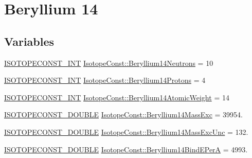 \hypertarget{group___isotope_const-_beryllium-_be14}{}\section{Beryllium 14}
\label{group___isotope_const-_beryllium-_be14}
\subsection*{Variables}
\begin{DoxyCompactItemize}
\item 
\mbox{\hyperlink{group___isotope_const-_macros_ga5f18360b3e99483a35c32d789e62621c}{I\+S\+O\+T\+O\+P\+E\+C\+O\+N\+S\+T\+\_\+\+I\+NT}} \mbox{\hyperlink{group___isotope_const-_beryllium-_be14_ga480138d58c6c1645063d7c3944cf50ba}{Isotope\+Const\+::\+Beryllium14\+Neutrons}} = 10
\item 
\mbox{\hyperlink{group___isotope_const-_macros_ga5f18360b3e99483a35c32d789e62621c}{I\+S\+O\+T\+O\+P\+E\+C\+O\+N\+S\+T\+\_\+\+I\+NT}} \mbox{\hyperlink{group___isotope_const-_beryllium-_be14_ga59ea3ad66098e699ba3a8217a3b1ba76}{Isotope\+Const\+::\+Beryllium14\+Protons}} = 4
\item 
\mbox{\hyperlink{group___isotope_const-_macros_ga5f18360b3e99483a35c32d789e62621c}{I\+S\+O\+T\+O\+P\+E\+C\+O\+N\+S\+T\+\_\+\+I\+NT}} \mbox{\hyperlink{group___isotope_const-_beryllium-_be14_ga1b4fd31f331e4d88ef6550c97c80ffa9}{Isotope\+Const\+::\+Beryllium14\+Atomic\+Weight}} = 14
\item 
\mbox{\hyperlink{group___isotope_const-_macros_ga8f45a7272ce02c0b4c65c44636ed719a}{I\+S\+O\+T\+O\+P\+E\+C\+O\+N\+S\+T\+\_\+\+D\+O\+U\+B\+LE}} \mbox{\hyperlink{group___isotope_const-_beryllium-_be14_ga5b0c4f1d53a16e1f67534105db64fe96}{Isotope\+Const\+::\+Beryllium14\+Mass\+Exc}} = 39954.
\item 
\mbox{\hyperlink{group___isotope_const-_macros_ga8f45a7272ce02c0b4c65c44636ed719a}{I\+S\+O\+T\+O\+P\+E\+C\+O\+N\+S\+T\+\_\+\+D\+O\+U\+B\+LE}} \mbox{\hyperlink{group___isotope_const-_beryllium-_be14_ga5435d710ae4add60a87eef68ead264b8}{Isotope\+Const\+::\+Beryllium14\+Mass\+Exc\+Unc}} = 132.
\item 
\mbox{\hyperlink{group___isotope_const-_macros_ga8f45a7272ce02c0b4c65c44636ed719a}{I\+S\+O\+T\+O\+P\+E\+C\+O\+N\+S\+T\+\_\+\+D\+O\+U\+B\+LE}} \mbox{\hyperlink{group___isotope_const-_beryllium-_be14_gac4da645936db0fd9b9cb26049e408462}{Isotope\+Const\+::\+Beryllium14\+Bind\+E\+PerA}} = 4993.
\item 

\end{DoxyCompactItemize}
